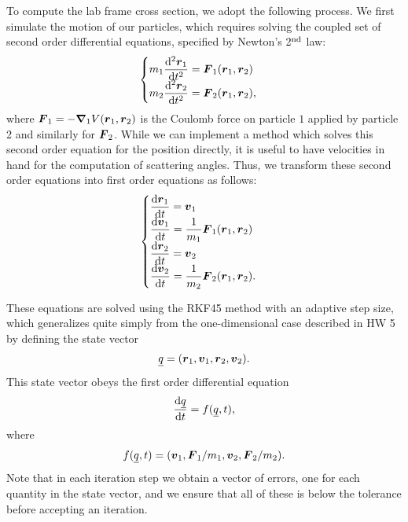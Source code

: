 To compute the lab frame cross section, we adopt the following process.
We first simulate the motion of our particles, which requires solving the coupled set of second order differential equations, specified by Newton's 2$^{\rm nd}$ law:
\begin{align}
\begin{cases}
    \displaystyle m_1 \dv[2]{\vb*{r}_{1}}{t} = \vb*{F}_{1}(\vb*{r}_{1},\vb*{r}_{2}) \\
    \displaystyle m_2 \dv[2]{\vb*{r}_{2}}{t} = \vb*{F}_{2}(\vb*{r}_{1},\vb*{r}_{2})
,\end{cases}
\end{align}
where $\vb*{F}_{1} = - \grad_{1} V(\vb*{r}_{1},\vb*{r}_{2})$ is the Coulomb force on particle $1$ applied by particle 2 and similarly for $\vb*{F}_{2}$.
While we can implement a method which solves this second order equation for the position directly, it is useful to have velocities in hand for the computation of scattering angles.
Thus, we transform these second order equations into first order equations as follows:
\begin{align}
\begin{cases}
    \displaystyle \dv{\vb*{r}_{1}}{t} = \vb*{v}_{1} \\
    \displaystyle \dv{\vb*{v}_{1}}{t} = \frac{1}{m_1} \vb*{F}_{1}(\vb*{r}_{1},\vb*{r}_{2}) \\
    \displaystyle \dv{\vb*{r}_{2}}{t} = \vb*{v}_{2} \\
    \displaystyle \dv{\vb*{v}_{2}}{t} = \frac{1}{m_2} \vb*{F}_{2}(\vb*{r}_{1},\vb*{r}_{2})
.\end{cases}
\end{align}

These equations are solved using the RKF45 method with an adaptive step size, which generalizes quite simply from the one-dimensional case described in HW 5 by defining the state vector
\begin{align}
    \underline{q} = ( \vb*{r}_{1}, \vb*{v}_{1}, \vb*{r}_{2}, \vb*{v}_{2} )
.\end{align}
This state vector obeys the first order differential equation
\begin{align}
    \dv{\underline{q}}{t} = f(\underline{q},t)
,\end{align}
where
\begin{align}
    f(\underline{q},t) = ( \vb*{v}_{1}, \vb*{F}_{1}/m_1, \vb*{v}_{2}, \vb*{F}_{2}/m_2 )
.\end{align}
Note that in each iteration step we obtain a vector of errors, one for each quantity in the state vector, and we ensure that all of these is below the tolerance before accepting an iteration.

